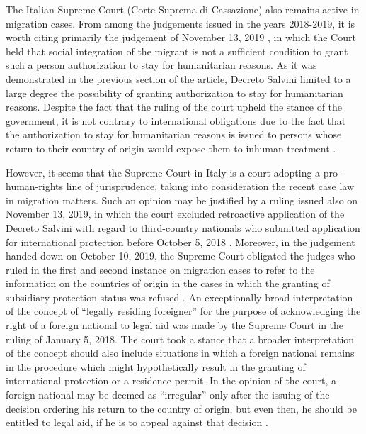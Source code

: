 \documentclass[10pt,a4paper]{article}
\begin{document}
\begin{multicols}{2}
The Italian Supreme Court (Corte Suprema di Cassazione) also remains active in migration cases. From among the judgements issued in the years 2018-2019, it is worth citing primarily the judgement of November 13, 2019 \citep{R81}, in which the Court held that social integration of the migrant is not a sufficient condition to grant such a person authorization to stay for humanitarian reasons. As it was demonstrated in the previous section of the article, Decreto Salvini limited to a large degree the possibility of granting authorization to stay for humanitarian reasons. Despite the fact that the ruling of the court upheld the stance of the government, it is not contrary to international obligations due to the fact that the authorization to stay for humanitarian reasons is issued to persons whose return to their country of origin would expose them to inhuman treatment \citep{R82,R83}.

However, it seems that the Supreme Court in Italy is a court adopting a pro-human-rights line of jurisprudence, taking into consideration the recent case law in migration matters. Such an opinion may be justified by a ruling issued also on November 13, 2019, in which the court excluded retroactive application of the Decreto Salvini with regard to third-country nationals who submitted application for international protection before October 5, 2018 \citep{R84}. Moreover, in the judgement handed down on October 10, 2019, the Supreme Court obligated the judges who ruled in the first and second instance on migration cases to refer to the information on the countries of origin in the cases in which the granting of subsidiary protection status was refused \citep{R85}. An exceptionally broad interpretation of the concept of ``legally residing foreigner'' for the purpose of acknowledging the right of a foreign national to legal aid was made by the Supreme Court in the ruling of January 5, 2018. The court took a stance that a broader interpretation of the concept should also include situations in which a foreign national remains in the procedure which might hypothetically result in the granting of international protection or a residence permit. In the opinion of the court, a foreign national may be deemed as ``irregular'' only after the issuing of the decision ordering his return to the country of origin, but even then, he should be entitled to legal aid, if he is to appeal against that decision \citep{R86}.


\end{multicols}
\end{document}
